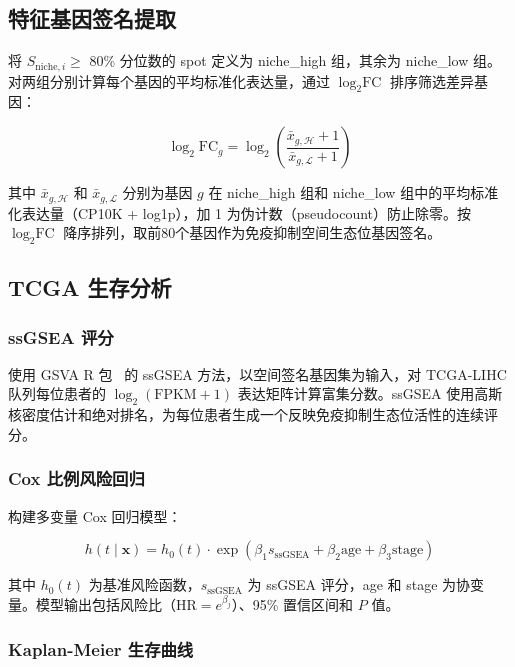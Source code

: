 \documentclass[12pt, a4paper]{ctexart}
\begin{document}
\subsection{特征基因签名提取}

将 $S_{\text{niche},i} \geq$ 80\% 分位数的 spot 定义为 niche\_high 组，其余为 niche\_low 组。对两组分别计算每个基因的平均标准化表达量，通过 $\log_2\text{FC}$ 排序筛选差异基因：

\begin{equation}
\log_2\text{FC}_{g} = \log_2\!\left(\frac{\bar{x}_{g,\mathcal{H}} + 1}{\bar{x}_{g,\mathcal{L}} + 1}\right)
\end{equation}

其中 $\bar{x}_{g,\mathcal{H}}$ 和 $\bar{x}_{g,\mathcal{L}}$ 分别为基因 $g$ 在 niche\_high 组和 niche\_low 组中的平均标准化表达量（CP10K + log1p），加 1 为伪计数（pseudocount）防止除零。按 $\log_2\text{FC}$ 降序排列，取前80个基因作为免疫抑制空间生态位基因签名。

\subsection{TCGA 生存分析}

\subsubsection{ssGSEA 评分}

使用 GSVA R 包~\cite{hanzelmann2013gsva} 的 ssGSEA 方法，以空间签名基因集为输入，对 TCGA-LIHC 队列每位患者的 $\log_2(\text{FPKM}+1)$ 表达矩阵计算富集分数。ssGSEA 使用高斯核密度估计和绝对排名，为每位患者生成一个反映免疫抑制生态位活性的连续评分。

\subsubsection{Cox 比例风险回归}

构建多变量 Cox 回归模型：

\begin{equation}
h(t \mid \mathbf{x}) = h_0(t) \cdot \exp\!\left(\beta_1 s_{\text{ssGSEA}} + \beta_2 \text{age} + \beta_3 \text{stage}\right)
\end{equation}

其中 $h_0(t)$ 为基准风险函数，$s_{\text{ssGSEA}}$ 为 ssGSEA 评分，age 和 stage 为协变量。模型输出包括风险比（$\text{HR} = e^{\beta_j}$）、95\% 置信区间和 $P$ 值。

\subsubsection{Kaplan-Meier 生存曲线}
\end{document}
